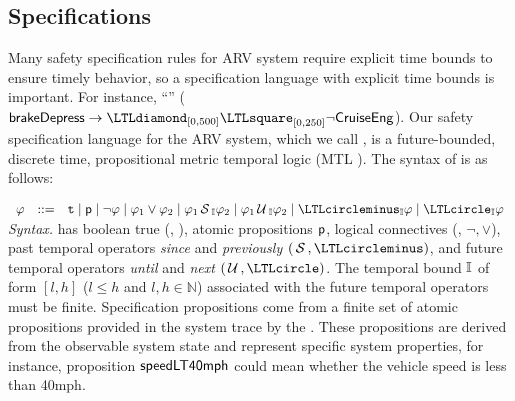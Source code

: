 \subsection{Specifications}
Many safety specification rules for ARV system require explicit time bounds to ensure timely behavior, 
so a specification language with explicit time bounds is important. 
For instance, 
``'' 
($\pred{brakeDepress} \rightarrow \eventually_{[0, 500]} \henceforth_{[0,250]} \neg \pred{CruiseEng}$). 
Our safety specification language for the ARV system, which we call \planguage, is a future-bounded, discrete time, propositional metric temporal logic (MTL \cite{Koymans1990}). 
The syntax of \planguage is as follows:

\(
\begin{array}{ccc}
\policy & ::=  & \true \mid \pred{p} \mid \neg \policy \mid \policy_1\vee \policy_2\mid
\policy_1\since_{\interval}\policy_2 \mid \policy_1\until_{\interval}\policy_2\mid\yesterday_{\interval}\policy\mid \tomorrow_{\interval}\policy
\end{array}
\) \\
\textit{Syntax.}
\planguage has boolean true (\ie, \true), 
atomic propositions $\mathsf{p}$, logical connectives (\ie, $\neg, \vee$), 
past temporal operators \emph{since} and \emph{previously} $(\since, \yesterday)$,  and future temporal operators \emph{until} and \emph{next} $(\until, \tomorrow)$. 
The temporal bound $\mathbb{I}$ of form $[l,h]$ ($l\leq h$ and $l,h\in\mathbb{N}$) associated with the future temporal operators must be finite.
Specification propositions  come from a finite set of atomic propositions provided in the system trace by the \sfmap. 
These propositions are derived from the observable system state and represent specific system properties, for instance, 
proposition $\mathsf{speedLT40mph}$ could mean whether the vehicle speed is less than 40mph.
%


